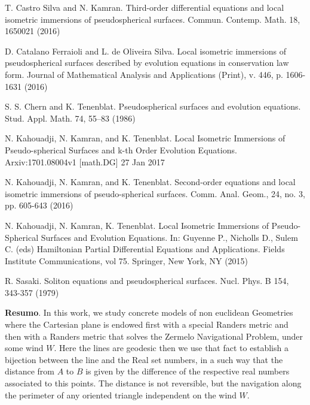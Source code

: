	\begin{thebibliography}{999}
		
		 T. Castro Silva and N. Kamran. Third-order differential equations and local isometric immersions of pseudospherical surfaces. Commun. Contemp. Math. 18, 1650021 (2016)
			
		 D. Catalano Ferraioli and L. de Oliveira Silva. Local isometric immersions of pseudospherical surfaces described by evolution equations in conservation law form. Journal of Mathematical Analysis and Applications (Print), v. 446, p. 1606-1631 (2016)
				
		 S. S. Chern and K. Tenenblat. Pseudospherical surfaces and evolution equations. Stud. Appl. Math. 74, 55–83 (1986)
		
		 N. Kahouadji, N. Kamran, and K. Tenenblat.  Local Isometric Immersions of Pseudo-spherical Surfaces and k-th Order Evolution Equations.  Arxiv:1701.08004v1 [math.DG] 27 Jan 2017
		
		 N. Kahouadji, N. Kamran, and K. Tenenblat.  Second-order equations and local isometric immersions of pseudo-spherical surfaces. Comm. Anal. Geom., 24, no. 3, pp. 605-643 (2016)
		
		 N. Kahouadji, N. Kamran, K. Tenenblat. Local Isometric Immersions of Pseudo-Spherical Surfaces and Evolution Equations. In: Guyenne P., Nicholls D., Sulem C. (eds) Hamiltonian Partial Differential Equations and Applications. Fields Institute Communications, vol 75. Springer, New York, NY (2015)
				
		 R. Sasaki. Soliton equations and pseudospherical surfaces. Nucl. Phys. B 154, 343-357 (1979)
		
	\end{thebibliography}
	
	
	\vspace{24pt}
	
	
	
	\noindent\textbf{Resumo}.\label{ms} 
	In this work, we study concrete models of  non euclidean Geometries where the Cartesian plane is endowed first with a special Randers metric and then with a Randers metric that solves the Zermelo Navigational Problem, under some wind $W$. Here the lines are geodesic then we use that fact to establish a bijection between the line and the Real set numbers, in a such way that the distance from $A$ to $B$  is given by the difference of the respective real numbers associated to this points. The distance is not reversible, but the navigation along the perimeter of any oriented triangle independent on the wind $W$. 

